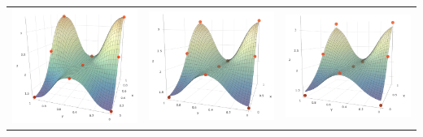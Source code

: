 \documentclass[11pt,margin=1in]{article}
\begin{document}
\begin{table}[!htbp]
  \centering
  \begin{tabular}{ccc}
    \includegraphics[width=5cm]{Quadratic_Box_Mesh} & \includegraphics[width=5cm]{Quad-1-1} & \includegraphics[width=5cm]{Quad-1-2} \\
  \end{tabular}
\end{table}  
\end{document}
